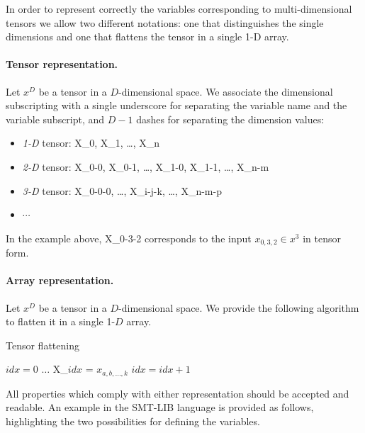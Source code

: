 In order to represent correctly the variables corresponding to multi-dimensional
tensors we allow two different notations: one that distinguishes the 
single dimensions and one that flattens the tensor in a single 1-D array.

\paragraph{Tensor representation.}
Let $x^D$ be a tensor in a $D$-dimensional space. We associate the dimensional
subscripting with a single underscore for separating the variable name and the
variable subscript, and $D-1$ dashes for separating the dimension values:
\begin{itemize}
	\item \textit{1-D} tensor: X\_0, X\_1, \ldots, X\_n
	\item \textit{2-D} tensor: X\_0-0, X\_0-1, \ldots, X\_1-0, X\_1-1, \ldots, X\_n-m
	\item \textit{3-D} tensor: X\_0-0-0, \ldots, X\_i-j-k, \ldots, X\_n-m-p
	\item $\cdots$
\end{itemize}
In the example above, X\_0-3-2 corresponds to the input $x_{0,3,2} \in x^3$ in 
tensor form.

\paragraph{Array representation.}
Let $x^D$ be a tensor in a $D$-dimensional space. We provide the following
algorithm to flatten it in a single 1-$D$ array.
\begin{algorithm}
	\caption{Tensor flattening}
	\label{alg:flatten}
	\begin{algorithmic}[1]
			\State $idx = 0$
					\State $\ldots$
						\State X\_$idx$ = $x_{a, b, \ldots, k}$
						\State $idx = idx + 1$
					\EndFor
				\EndFor
			\EndFor
		\EndProcedure
	\end{algorithmic}
\end{algorithm}

All properties which comply with either representation should be accepted
and readable. An example in the SMT-LIB language is provided as follows,
highlighting the two possibilities for defining the variables.

